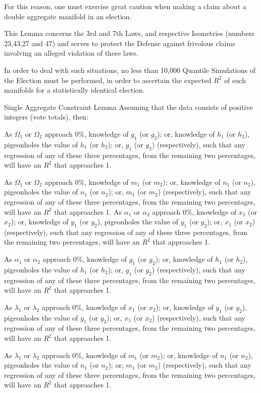For this reason, one must exercise great caution when making a claim about a double aggregate manifold in an election. 

This Lemma concerns the 3rd and 7th  Laws, and respective Isometries (numbers 23,43,27 and 47) and serves to protect the Defense against frivolous claims involving an alleged violation of these laws.

In order to deal with such situations, no less than 10,000 Quantile Simulations of the Election must be performed, in order to ascertain the expected $R^2$ of such manifolds for a statistically identical election.

\begin{lemma}{Single Aggregate Constraint Lemma}
Assuming that the data consists of positive integers (vote totals), then:

As $\Omega_{1}$ or $\Omega_{2}$ approach 0\%, knowledge of $g_{1}$ (or $g_{2}$); or, knowledge of $h_{1}$ (or $h_{2}$), pigeonholes the value of $h_{1}$ (or $h_{2}$); or, $g_{1}$ (or $g_{2}$) (respectively), such that any regression of any of these three percentages, from the remaining two percentages, will have an $R^2$ that approaches 1.

As $\Omega_{1}$ or $\Omega_{2}$ approach 0\%, knowledge of $m_{1}$ (or $m_{2}$); or, knowledge of $n_{1}$ (or $n_{2}$), pigeonholes the value of $n_{1}$ (or $n_{2}$); or, $m_{1}$ (or $m_{2}$) (respectively), such that any regression of any of these three percentages, from the remaining two percentages, will have an $R^2$ that approaches 1.
\newpage
As $\alpha_{1}$ or $\alpha_{2}$ approach 0\%, knowledge of $x_{1}$ (or $x_{2}$); or, knowledge of $y_{1}$ (or $y_{2}$), pigeonholes the value of $y_{1}$ (or $y_{2}$); or, $x_{1}$ (or $x_{2}$) (respectively), such that any regression of any of these three percentages, from the remaining two percentages, will have an $R^2$ that approaches 1.

As $\alpha_{1}$ or $\alpha_{2}$ approach 0\%, knowledge of $g_{1}$ (or $g_{2}$); or, knowledge of $h_{1}$ (or $h_{2}$), pigeonholes the value of $h_{1}$ (or $h_{2}$); or, $g_{1}$ (or $g_{2}$) (respectively), such that any regression of any of these three percentages, from the remaining two percentages, will have an $R^2$ that approaches 1.

As $\lambda_{1}$ or $\lambda_{2}$ approach 0\%, knowledge of $x_{1}$ (or $x_{2}$); or, knowledge of $y_{1}$ (or $y_{2}$), pigeonholes the value of $y_{1}$ (or $y_{2}$); or, $x_{1}$ (or $x_{2}$) (respectively), such that any regression of any of these three percentages, from the remaining two percentages, will have an $R^2$ that approaches 1.

As $\lambda_{1}$ or $\lambda_{2}$ approach 0\%, knowledge of $m_{1}$ (or $m_{2}$); or, knowledge of $n_{1}$ (or $n_{2}$), pigeonholes the value of $n_{1}$ (or $n_{2}$); or, $m_{1}$ (or $m_{2}$) (respectively), such that any regression of any of these three percentages, from the remaining two percentages, will have an $R^2$ that approaches 1.
\end{lemma}
